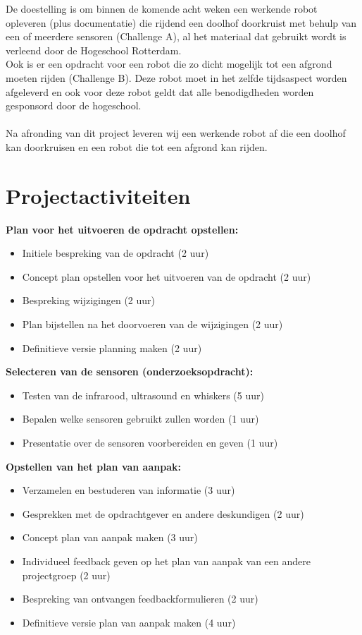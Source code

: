 \documentclass[oneside]{book}
\begin{document}
{\color{red}De doestelling is om binnen de komende acht weken een werkende robot opleveren (plus documentatie) die rijdend een doolhof doorkruist met behulp van een of meerdere sensoren (Challenge A), al het materiaal dat gebruikt wordt is verleend door de Hogeschool Rotterdam.\\
Ook is er een opdracht voor een robot die zo dicht mogelijk tot een afgrond moeten rijden (Challenge B). Deze robot moet in het zelfde tijdsaspect worden afgeleverd en ook voor deze robot geldt dat alle benodigdheden worden gesponsord door de hogeschool.}\\
\\
{\color{red}Na afronding van dit project leveren wij een werkende robot af die een doolhof kan doorkruisen en een robot die tot een afgrond kan rijden.}
\clearpage
\chapter{Projectactiviteiten}
{\large \textbf{ Plan voor het uitvoeren de opdracht opstellen:}}
\begin{itemize}
\item Initiele bespreking van de opdracht (2 uur)
\item Concept plan opstellen voor het uitvoeren van de opdracht (2 uur)
\item Bespreking wijzigingen (2 uur)
\item Plan bijstellen na het doorvoeren van de wijzigingen (2 uur)
\item Definitieve versie planning maken (2 uur)
\end{itemize}

{\large \textbf{Selecteren van de sensoren (onderzoeksopdracht):}}
\begin{itemize}
\item Testen van de infrarood, ultrasound en whiskers (5 uur)
\item Bepalen welke sensoren gebruikt zullen worden (1 uur)
\item Presentatie over de sensoren voorbereiden en geven (1 uur)
\end{itemize}

{\large \textbf{Opstellen van het plan van aanpak:}}
\begin{itemize}
\item Verzamelen en bestuderen van informatie (3 uur)
\item Gesprekken met de opdrachtgever en andere deskundigen (2 uur)
\item Concept plan van aanpak maken (3 uur)
\item Individueel feedback geven op het plan van aanpak van een andere projectgroep  (2 uur)
\item Bespreking van ontvangen feedbackformulieren (2 uur)
\item Definitieve versie plan van aanpak maken (4 uur)
\end{itemize}
\end{document}
